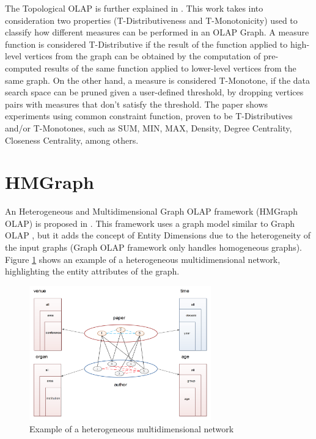 The Topological OLAP is further explained in \cite{Qu2011}. This work takes into consideration two properties (T-Distributiveness and T-Monotonicity) used to classify how different measures can be performed in an OLAP Graph. A measure function is considered T-Distributive if the result of the function applied to high-level vertices from the graph can be obtained by the computation of pre-computed results of the same function applied to lower-level vertices from the same graph. On the other hand, a measure is considered T-Monotone, if the data search space can be pruned given a user-defined threshold, by dropping vertices pairs with measures that don't satisfy the threshold. The paper shows experiments using common constraint function, proven to be T-Distributives and/or T-Monotones, such as SUM, MIN, MAX, Density, Degree Centrality, Closeness Centrality, among others.

\section{HMGraph}

An Heterogeneous and Multidimensional Graph OLAP framework (HMGraph OLAP) is proposed in \cite{Yin2012}. This framework uses a graph model similar to Graph OLAP \cite{Chen2008}, but it adds the concept of Entity Dimensions due to the heterogeneity of the input graphs (Graph OLAP framework only handles homogeneous graphs). Figure \ref{fig:figure17} shows an example of a heterogeneous multidimensional network, highlighting the entity attributes of the graph.

\begin{figure}[ht]
\centering
\includegraphics[width=0.7\textwidth]{../heterogeneous_graph_example.png}
\caption{Example of a heterogeneous multidimensional network \cite{Yin2012}}
\label{fig:figure17}
\end{figure}

